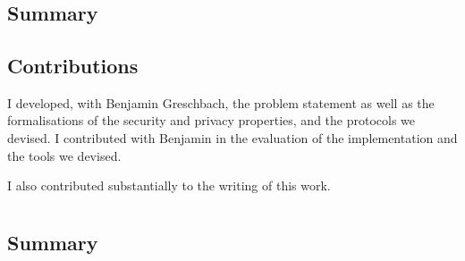 \section{}
\begingroup\centering
\begin{ppBox}
\end{ppBox}
\endgroup

\subsection{Summary}
    \label{subsection:summary-ei}


\subsection{Contributions}
    \label{subsection:contributions-ei}
I developed, with Benjamin Greschbach, the problem statement as well as the formalisations 
of the security and privacy properties, and the protocols we devised. I contributed 
with Benjamin in the evaluation of the implementation and the tools we devised.

I also contributed substantially to the writing of this work.


\section{}
\begingroup\centering
\begin{ppBox}
\end{ppBox}
\endgroup

\subsection{Summary}
    \label{subsection:summary-dss}


